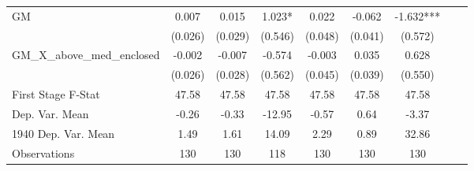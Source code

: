 \begin{tabular}{l*{8}{c}}
\cmidrule(lr){1-7}
GM              &    0.007   &    0.015   &    1.023*  &    0.022   &   -0.062   &   -1.632***\\
                &  (0.026)   &  (0.029)   &  (0.546)   &  (0.048)   &  (0.041)   &  (0.572)   \\
\addlinespace
GM\_X\_above\_med\_enclosed&   -0.002   &   -0.007   &   -0.574   &   -0.003   &    0.035   &    0.628   \\
                &  (0.026)   &  (0.028)   &  (0.562)   &  (0.045)   &  (0.039)   &  (0.550)   \\
\midrule
First Stage F-Stat&    47.58   &    47.58   &    47.58   &    47.58   &    47.58   &    47.58   \\
Dep. Var. Mean  &    -0.26   &    -0.33   &   -12.95   &    -0.57   &     0.64   &    -3.37   \\
1940 Dep. Var. Mean&     1.49   &     1.61   &    14.09   &     2.29   &     0.89   &    32.86   \\
Observations    &      130   &      130   &      118   &      130   &      130   &      130   \\
 \bottomrule \end{tabular}
